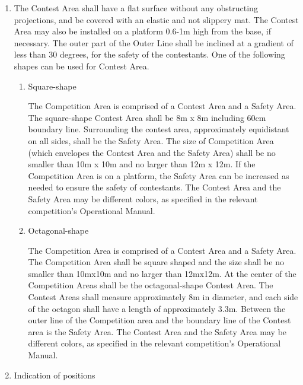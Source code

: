 \documentclass[
]{report}
\begin{document}
\begin{enumerate}
\item
  The Contest Area shall have a flat surface without any obstructing
  projections, and be covered with an elastic and not slippery mat. The
  Contest Area may also be installed on a platform 0.6-1m high from the
  base, if necessary. The outer part of the Outer Line shall be inclined
  at a gradient of less than 30 degrees, for the safety of the
  contestants. One of the following shapes can be used for Contest Area.

  \begin{enumerate}
  \item
    Square-shape

    The Competition Area is comprised of a Contest Area and a Safety
    Area. The square-shape Contest Area shall be 8m x 8m including 60cm
    boundary line. Surrounding the contest area, approximately
    equidistant on all sides, shall be the Safety Area. The size of
    Competition Area (which envelopes the Contest Area and the Safety
    Area) shall be no smaller than 10m x 10m and no larger than 12m x
    12m. If the Competition Area is on a platform, the Safety Area can
    be increased as needed to ensure the safety of contestants. The
    Contest Area and the Safety Area may be different colors, as
    specified in the relevant competition's Operational Manual.
  \item
    Octagonal-shape

    The Competition Area is comprised of a Contest Area and a Safety
    Area. The Competition Area shall be square shaped and the size shall
    be no smaller than 10mx10m and no larger than 12mx12m. At the center
    of the Competition Areas shall be the octagonal-shape Contest Area.
    The Contest Areas shall measure approximately 8m in diameter, and
    each side of the octagon shall have a length of approximately 3.3m.
    Between the outer line of the Competition area and the boundary line
    of the Contest area is the Safety Area. The Contest Area and the
    Safety Area may be different colors, as specified in the relevant
    competition's Operational Manual.
  \end{enumerate}
\item
  Indication of positions


\end{enumerate}
\end{document}
